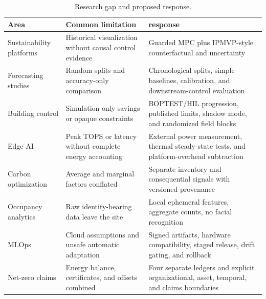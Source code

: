 \begin{table}[t]
	\centering
	\caption{Research gap and proposed response.}
	\label{tab:gap}
	\begin{tabularx}{\textwidth}{p{}X X}
		\toprule
		Area                     & Common limitation                                        & \system{} response                                                                        \\
		\midrule
		Sustainability platforms & Historical visualization without causal control evidence & Guarded MPC plus IPMVP-style counterfactual and uncertainty                               \\
		Forecasting studies      & Random splits and accuracy-only comparison               & Chronological splits, simple baselines, calibration, and downstream-control evaluation    \\
		Building control         & Simulation-only savings or opaque constraints            & BOPTEST/HIL progression, published limits, shadow mode, and randomized field blocks       \\
		Edge AI                  & Peak TOPS or latency without complete energy accounting  & External power measurement, thermal steady-state tests, and platform-overhead subtraction \\
		Carbon optimization      & Average and marginal factors conflated                   & Separate inventory and consequential signals with versioned provenance                    \\
		Occupancy analytics      & Raw identity-bearing data leave the site                 & Local ephemeral features, aggregate counts, no facial recognition                         \\
		MLOps                    & Cloud assumptions and unsafe automatic adaptation        & Signed artifacts, hardware compatibility, staged release, drift gating, and rollback      \\
		Net-zero claims          & Energy balance, certificates, and offsets combined       & Four separate ledgers and explicit organizational, asset, temporal, and claims boundaries \\
		\bottomrule
	\end{tabularx}
\end{table}
